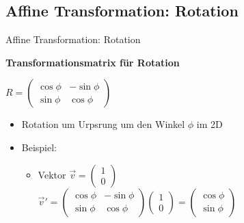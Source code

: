 \documentclass[10pt,aspectratio=169]{beamer}
\begin{document}
  \subsection{Affine Transformation: Rotation}
  \begin{frame}{Affine Transformation: Rotation}
      \begin{minipage}{9cm}
        \textbf{Transformationsmatrix für Rotation}
        \begin{center}
          $R = \begin{pmatrix}
            \cos\phi & -\sin\phi\\
            \sin\phi & \cos\phi
          \end{pmatrix}$
          \begin{itemize}
            \item Rotation um Urpsrung um den Winkel $\phi$ im 2D
            \item Beispiel:
            \begin{itemize}
              \item Vektor $\vec{v} = \begin{pmatrix}
                1\\0
              \end{pmatrix}$\\\vspace{0.1cm}
                $\vec{v}' = \begin{pmatrix}
                  \cos\phi & -\sin\phi\\
                  \sin\phi & \cos\phi
                \end{pmatrix}\begin{pmatrix}
                  1\\0
                \end{pmatrix} = \begin{pmatrix}
                  \cos\phi\\\sin\phi
                \end{pmatrix}$  
            \end{itemize}
          \end{itemize}
        \end{center}
      \end{minipage}
      \begin{minipage}{4cm}

\end{minipage}
\end{frame}
\end{document}

